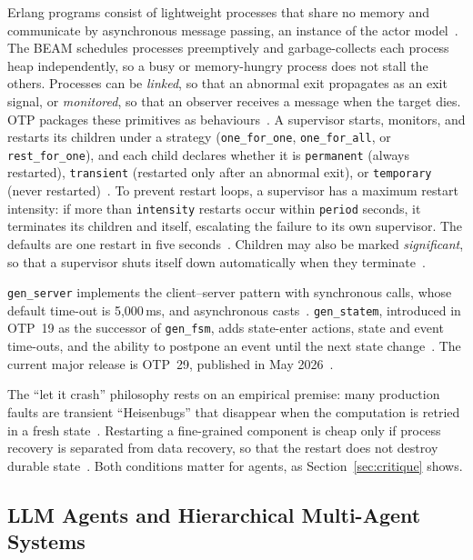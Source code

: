 \documentclass[conference,letterpaper]{IEEEtran}
\newcommand{\code}[1]{\texttt{#1}}
\newcommand{\gs}{\code{gen\_server}}
\newcommand{\gsm}{\code{gen\_statem}}
\begin{document}
Erlang programs consist of lightweight processes that share no memory and
communicate by asynchronous message passing, an instance of the actor
model~\cite{hewitt1973,agha1986,armstrong2003}. The BEAM
schedules processes preemptively and garbage-collects each process heap
independently, so a busy or memory-hungry process does not stall the others.
Processes can be \emph{linked}, so that an abnormal exit propagates as an
exit signal, or \emph{monitored}, so that an observer receives a message
when the target dies. OTP packages these primitives as
behaviours~\cite{cesarini2016}. A supervisor starts, monitors, and restarts
its children under a strategy (\code{one\_for\_one}, \code{one\_for\_all},
or \code{rest\_for\_one}), and each child declares whether it is
\code{permanent} (always restarted), \code{transient} (restarted only after
an abnormal exit), or \code{temporary} (never restarted)~\cite{otp-sup}. To
prevent restart loops, a supervisor has a maximum restart intensity: if more
than \code{intensity} restarts occur within \code{period} seconds, it
terminates its children and itself, escalating the failure to its own
supervisor. The defaults are one restart in five seconds~\cite{otp-sup}.
Children may also be marked \emph{significant}, so that a supervisor shuts
itself down automatically when they terminate~\cite{otp-sup}.

\gs{} implements the client--server pattern with synchronous calls, whose
default time-out is 5{,}000\,ms, and asynchronous casts~\cite{otp-genserver}.
\gsm{}, introduced in OTP~19 as the successor of \code{gen\_fsm}, adds
state-enter actions, state and event time-outs, and the ability to postpone
an event until the next state change~\cite{otp-statem}. The current major
release is OTP~29, published in May 2026~\cite{otp29}.

The ``let it crash'' philosophy rests on an empirical premise: many
production faults are transient ``Heisenbugs'' that disappear when the
computation is retried in a fresh state~\cite{gray1985}. Restarting a
fine-grained component is cheap only if process recovery is separated from
data recovery, so that the restart does not destroy durable
state~\cite{candea2004}. Both conditions matter for agents, as
Section~\ref{sec:critique} shows.

\subsection{LLM Agents and Hierarchical Multi-Agent Systems}
\end{document}
